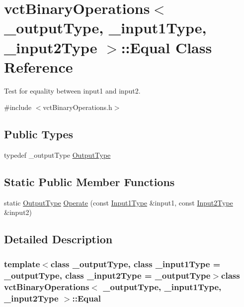 \hypertarget{classvct_binary_operations_1_1_equal}{\section{vct\-Binary\-Operations$<$ \-\_\-output\-Type, \-\_\-input1\-Type, \-\_\-input2\-Type $>$\-:\-:Equal Class Reference}
\label{classvct_binary_operations_1_1_equal}
}


Test for equality between input1 and input2.  




{\ttfamily \#include $<$vct\-Binary\-Operations.\-h$>$}

\subsection*{Public Types}
\begin{DoxyCompactItemize}
\item 
typedef \-\_\-output\-Type \hyperlink{classvct_binary_operations_1_1_equal_a2dba579c81934507cd04ae9a4ed2c0c4}{Output\-Type}
\end{DoxyCompactItemize}
\subsection*{Static Public Member Functions}
\begin{DoxyCompactItemize}
\item 
static \hyperlink{classvct_binary_operations_1_1_equal_a2dba579c81934507cd04ae9a4ed2c0c4}{Output\-Type} \hyperlink{classvct_binary_operations_1_1_equal_aabfd9cec34c3e08993fc1aef8b1f4e59}{Operate} (const \hyperlink{classvct_binary_operations_a5e56a66a012d6a28c539a08a0021c45e}{Input1\-Type} \&input1, const \hyperlink{classvct_binary_operations_a929119af557a04a16b4d854981e49e1b}{Input2\-Type} \&input2)
\end{DoxyCompactItemize}


\subsection{Detailed Description}
\subsubsection*{template$<$class \-\_\-output\-Type, class \-\_\-input1\-Type = \-\_\-output\-Type, class \-\_\-input2\-Type = \-\_\-output\-Type$>$class vct\-Binary\-Operations$<$ \-\_\-output\-Type, \-\_\-input1\-Type, \-\_\-input2\-Type $>$\-::\-Equal}

